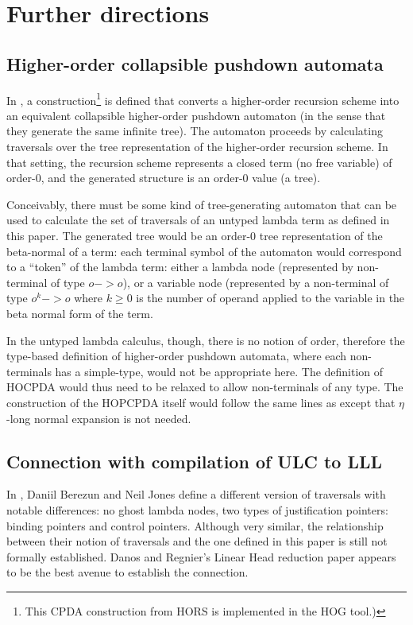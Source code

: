 \documentclass{article}
\theoremstyle{definition}
\begin{document}
\section{Further directions}

\subsection{Higher-order collapsible pushdown automata}

In \cite{Ong2006}, a construction\footnote{This CPDA construction from HORS is implemented in the HOG tool.)}
 is defined that converts a higher-order recursion scheme into an equivalent collapsible higher-order pushdown automaton (in the sense that they generate the same infinite tree). The automaton proceeds by calculating traversals over the tree representation of the higher-order recursion scheme. In that setting, the recursion scheme represents a closed term (no free variable) of order-$0$, and the generated structure is an order-$0$ value (a tree).

Conceivably, there must be some kind of tree-generating automaton that can be used to calculate the set of traversals of an untyped lambda term as defined in this paper. The generated tree would be an order-$0$ tree representation of the beta-normal of a term: each terminal symbol of the automaton would correspond to a ``token'' of the lambda term: either a lambda node (represented by non-terminal of type $o->o$), or a variable node (represented by a non-terminal of type $o^k->o$ where $k\geq0$ is the number of operand applied to the variable in the beta normal form of the term.

In the untyped lambda calculus, though, there is no notion of order, therefore the type-based definition of higher-order pushdown automata, where each non-terminals has a simple-type, would not be appropriate here. The definition of HOCPDA would thus need to be relaxed to allow non-terminals of any type. The construction of the HOPCPDA itself would follow the same lines as \cite{Ong2006} except that $\eta$-long normal expansion is not needed.

\subsection{Connection with compilation of ULC to LLL}

In \cite{JonesBerezunLLL}, Daniil Berezun and Neil Jones define a different version of traversals with notable differences: no ghost lambda nodes, two types of justification pointers: binding pointers and control pointers. Although very similar, the relationship between their notion of traversals and the one defined in this paper is still not formally established. Danos and Regnier's Linear Head reduction paper \cite{danos-head} appears to be the best avenue to establish the connection.
\end{document}
